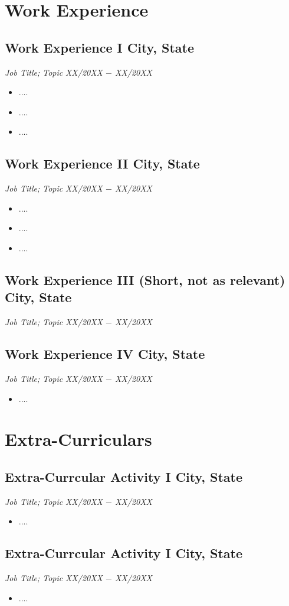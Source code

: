 \documentclass[10pt,letterpaper]{article}						%
\newcommand{\NameDate}[2]{%
  \subsection[#1]{#1 \hfill #2}%
}
\newcommand{\myitem}{\item[\tiny$\blacksquare$]}
\begin{document}
\section{Work Experience}
\NameDate{Work Experience I}{City, State}
\textit{Job Title; Topic} \hfill \textit {XX/20XX $-$ XX/20XX} \\[-6.25mm]
\begin{itemize}
\setlength\itemsep{-0.35em}
\myitem ....
\myitem ....
\myitem ....
\end{itemize}

\NameDate{Work Experience II}{City, State}
\textit{Job Title; Topic} \hfill \textit {XX/20XX $-$ XX/20XX} \\[-6.25mm]
\begin{itemize}
\setlength\itemsep{-0.35em}
\myitem ....
\myitem ....
\myitem ....
\end{itemize}

\NameDate{Work Experience III (Short,  not as relevant)}{City, State}
\textit{Job Title; Topic} \hfill \textit {XX/20XX $-$ XX/20XX}  \\[-2.5mm] 		%


\NameDate{Work Experience IV}{City, State}
\textit{Job Title; Topic} \hfill \textit {XX/20XX $-$ XX/20XX} \\[-6.25mm]
\begin{itemize}
\setlength\itemsep{-0.35em}
\myitem ....
\end{itemize}


 

\section{Extra-Curriculars}
\NameDate{Extra-Currcular Activity I}{City, State}
\textit{Job Title; Topic} \hfill \textit {XX/20XX $-$ XX/20XX} \\[-6.25mm]
\begin{itemize}
\setlength\itemsep{-0.35em}
\myitem ....
\end{itemize}

\NameDate{Extra-Currcular Activity I}{City, State}
\textit{Job Title; Topic} \hfill \textit {XX/20XX $-$ XX/20XX} \\[-6.25mm]
\begin{itemize}
\setlength\itemsep{-0.35em}
\myitem ....
\end{itemize}
\end{document}
